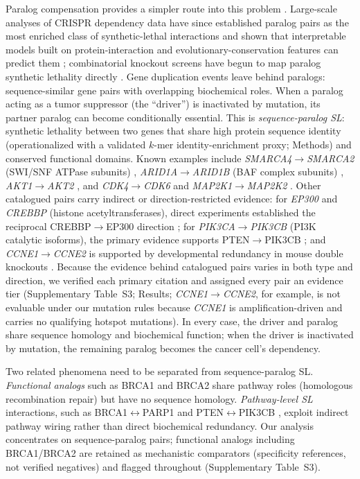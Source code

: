 \documentclass[11pt,a4paper]{article}
\begin{document}
Paralog compensation provides a simpler route into this problem \cite{Koonin2005,DAntonio2013}. Large-scale analyses of CRISPR dependency data have since established paralog pairs as the most enriched class of synthetic-lethal interactions and shown that interpretable models built on protein-interaction and evolutionary-conservation features can predict them \cite{DeKegel2021}; combinatorial knockout screens have begun to map paralog synthetic lethality directly \cite{Parrish2021,Thompson2021,Dede2020,EsmaeiliAnvar2024,Harle2025,Flister2025}. Gene duplication events leave behind paralogs: sequence-similar gene pairs with overlapping biochemical roles. When a paralog acting as a tumor suppressor (the ``driver'') is inactivated by mutation, its partner paralog can become conditionally essential. This is \textit{sequence-paralog SL}: synthetic lethality between two genes that share high protein sequence identity (operationalized with a validated $k$-mer identity-enrichment proxy; Methods) and conserved functional domains. Known examples include \textit{SMARCA4}$\rightarrow$\textit{SMARCA2} (SWI/SNF ATPase subunits) \cite{Hoffman2014}, \textit{ARID1A}$\rightarrow$\textit{ARID1B} (BAF complex subunits) \cite{Helming2014}, \textit{AKT1}$\rightarrow$\textit{AKT2} \cite{Najm2018}, and \textit{CDK4}$\rightarrow$\textit{CDK6} and \textit{MAP2K1}$\rightarrow$\textit{MAP2K2} \cite{Parrish2021}. Other catalogued pairs carry indirect or direction-restricted evidence: for \textit{EP300} and \textit{CREBBP} (histone acetyltransferases), direct experiments established the reciprocal CREBBP$\rightarrow$EP300 direction \cite{Ogiwara2016,Nie2021}; for \textit{PIK3CA}$\rightarrow$\textit{PIK3CB} (PI3K catalytic isoforms), the primary evidence supports PTEN$\rightarrow$PIK3CB \cite{Wee2008}; and \textit{CCNE1}$\rightarrow$\textit{CCNE2} is supported by developmental redundancy in mouse double knockouts \cite{Geng2003}. Because the evidence behind catalogued pairs varies in both type and direction, we verified each primary citation and assigned every pair an evidence tier (Supplementary Table~S3; Results; \textit{CCNE1}$\rightarrow$\textit{CCNE2}, for example, is not evaluable under our mutation rules because \textit{CCNE1} is amplification-driven and carries no qualifying hotspot mutations). In every case, the driver and paralog share sequence homology and biochemical function; when the driver is inactivated by mutation, the remaining paralog becomes the cancer cell's dependency.

Two related phenomena need to be separated from sequence-paralog SL. \textit{Functional analogs} such as BRCA1 and BRCA2 share pathway roles (homologous recombination repair) but have no sequence homology. \textit{Pathway-level SL} interactions, such as BRCA1$\leftrightarrow$PARP1 and PTEN$\leftrightarrow$PIK3CB \cite{Jia2008,Wee2008}, exploit indirect pathway wiring rather than direct biochemical redundancy. Our analysis concentrates on sequence-paralog pairs; functional analogs including BRCA1/BRCA2 are retained as mechanistic comparators (specificity references, not verified negatives) and flagged throughout (Supplementary Table~S3).
\end{document}
